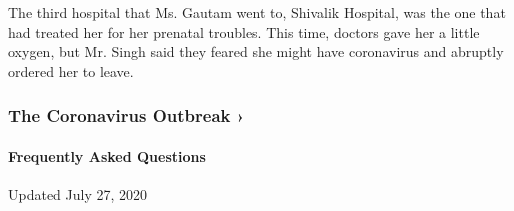 The third hospital that Ms. Gautam went to, Shivalik Hospital, was the
one that had treated her for her prenatal troubles. This time, doctors
gave her a little oxygen, but Mr. Singh said they feared she might have
coronavirus and abruptly ordered her to leave.

\href{https://www.nytimes.com/news-event/coronavirus?action=click\&pgtype=Article\&state=default\&region=MAIN_CONTENT_3\&context=storylines_faq}{}

\hypertarget{the-coronavirus-outbreak-}{%
\subsubsection{The Coronavirus Outbreak
›}\label{the-coronavirus-outbreak-}}

\hypertarget{frequently-asked-questions}{%
\paragraph{Frequently Asked
Questions}\label{frequently-asked-questions}}

Updated July 27, 2020

